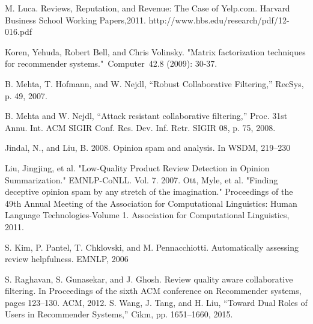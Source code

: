 \documentclass[master,english,final]{kaist-ucs}
\begin{document}
\begin{thebibliography}{00}


 M. Luca. Reviews, Reputation, and Revenue: The Case of Yelp.com. Harvard Business School Working Papers,2011. http://www.hbs.edu/research/pdf/12-016.pdf

 Koren, Yehuda, Robert Bell, and Chris Volinsky. "Matrix factorization techniques for recommender systems." Computer 42.8 (2009): 30-37.

 B. Mehta, T. Hofmann, and W. Nejdl, “Robust Collaborative Filtering,” RecSys, p. 49, 2007.

 B. Mehta and W. Nejdl, “Attack resistant collaborative filtering,” Proc. 31st Annu. Int. ACM SIGIR Conf. Res. Dev. Inf. Retr. SIGIR 08, p. 75, 2008.



 Jindal, N., and Liu, B. 2008. Opinion spam and analysis. In WSDM, 219–230

 Liu, Jingjing, et al. "Low-Quality Product Review Detection in Opinion Summarization." EMNLP-CoNLL. Vol. 7. 2007.
 Ott, Myle, et al. "Finding deceptive opinion spam by any stretch of the imagination." Proceedings of the 49th Annual Meeting of the Association for Computational Linguistics: Human Language Technologies-Volume 1. Association for Computational Linguistics, 2011.

 S. Kim, P. Pantel, T. Chklovski, and M. Pennacchiotti. Automatically assessing review helpfulness. EMNLP, 2006

 S. Raghavan, S. Gunasekar, and J. Ghosh. Review quality aware collaborative filtering. In Proceedings of the sixth ACM conference on Recommender systems, pages 123–130. ACM, 2012.
 S. Wang, J. Tang, and H. Liu, “Toward Dual Roles of Users in Recommender Systems,” Cikm, pp. 1651–1660, 2015.


\end{thebibliography}
\end{document}
